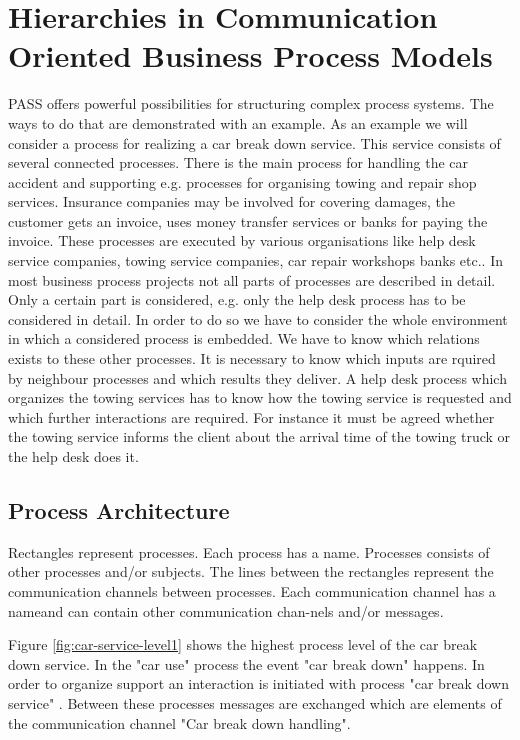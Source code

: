 \section{Hierarchies in Communication Oriented Business Process Models}
PASS  offers powerful possibilities for structuring complex process systems. The ways to do that are demonstrated with an example.
As an example we will consider a process for realizing a car break down service. This service consists of several connected processes. There is the main process for handling the car accident and supporting e.g. processes for organising towing and repair shop services. Insurance companies may be involved for covering damages, the customer gets an invoice, uses money transfer services or banks for paying the invoice. These processes are executed by various organisations like help desk service companies, towing service companies, car repair workshops banks etc.. In most business process projects not all parts of processes are described in detail. Only a certain part is considered, e.g. only the help desk process has to be considered in detail. In order to do so we have to consider the whole environment in which a considered process is embedded. We have to know which relations exists to these other processes. It is necessary to know which inputs are rquired by neighbour processes and which results they deliver. A help desk process which organizes the towing services has to know how the towing service is requested and which further interactions are required. For instance it must be agreed whether the towing service informs the client about the arrival time of the towing truck or the help desk does it.


\subsection{Process Architecture}

Rectangles represent processes. Each process has a name. Processes consists of other processes and/or subjects. The lines between the rectangles represent the communication channels between processes. Each communication channel has a nameand can contain other communication chan-nels and/or messages.

Figure \ref{fig:car-service-level1} shows the highest process level of the car break down service. In the "car use" process the event "car break down" happens. In order to organize support an interaction is initiated with process "car break down service" . Between these processes messages are exchanged which are elements of the communication channel "Car break down handling".\\


